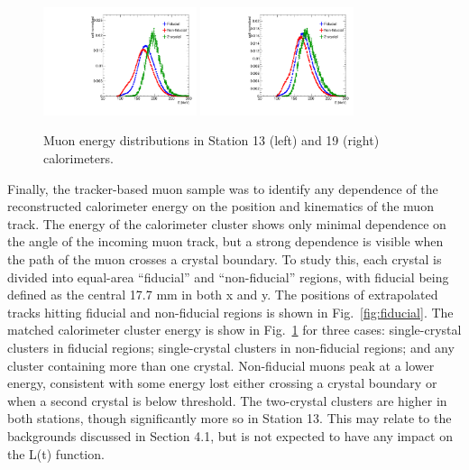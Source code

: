 \documentclass[a4paper, 11pt]{article}
\begin{document}
\begin{figure}[h]
\centering
\includegraphics[width=0.4\textwidth]{figures/St13_mu_E_fid.pdf}
\includegraphics[width=0.4\textwidth]{figures/St19_mu_E_fid.pdf}
\caption{Muon energy distributions in Station 13 (left) and 19 (right) calorimeters. \label{fig:E_dep}}
\end{figure}

Finally, the tracker-based muon sample was to identify any dependence of the reconstructed calorimeter energy on the position and kinematics of the muon track. The energy of the calorimeter cluster shows only minimal dependence on the angle of the incoming muon track, but a strong dependence is visible when the path of the muon crosses a crystal boundary. To study this, each crystal is divided into equal-area ``fiducial'' and ``non-fiducial'' regions, with fiducial being defined as the central 17.7 mm in both x and y. The positions of extrapolated tracks hitting fiducial and non-fiducial regions is shown in Fig.~\ref{fig:fiducial}. The matched calorimeter cluster energy is show in Fig.~\ref{fig:E_dep} for three cases: single-crystal clusters in fiducial regions; single-crystal clusters in non-fiducial regions; and any cluster containing more than one crystal. Non-fiducial muons peak at a lower energy, consistent with some energy lost either crossing a crystal boundary or when a second crystal is below threshold. The two-crystal clusters are higher in both stations, though significantly more so in Station 13. This may relate to the backgrounds discussed in Section 4.1, but is not expected to have any impact on the L(t) function.
\end{document}
